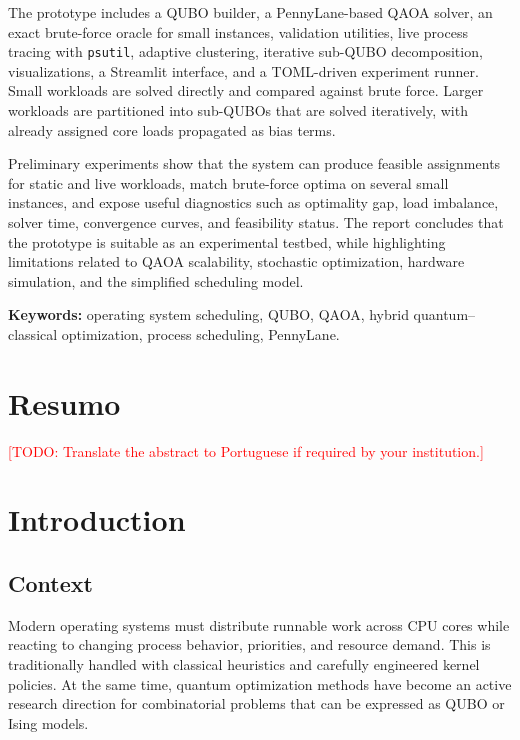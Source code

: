 \documentclass[12pt,a4paper,oneside]{report}
\newcommand{\todo}[1]{\textcolor{red}{[TODO: #1]}}
\begin{document}
The prototype includes a QUBO builder, a PennyLane-based QAOA solver, an exact
brute-force oracle for small instances, validation utilities, live process
tracing with \texttt{psutil}, adaptive clustering, iterative sub-QUBO
decomposition, visualizations, a Streamlit interface, and a TOML-driven
experiment runner. Small workloads are solved directly and compared against
brute force. Larger workloads are partitioned into sub-QUBOs that are solved
iteratively, with already assigned core loads propagated as bias terms.

Preliminary experiments show that the system can produce feasible assignments
for static and live workloads, match brute-force optima on several small
instances, and expose useful diagnostics such as optimality gap, load imbalance,
solver time, convergence curves, and feasibility status. The report concludes
that the prototype is suitable as an experimental testbed, while highlighting
limitations related to QAOA scalability, stochastic optimization, hardware
simulation, and the simplified scheduling model.

\textbf{Keywords:} operating system scheduling, QUBO, QAOA, hybrid
quantum--classical optimization, process scheduling, PennyLane.

\chapter*{Resumo}
\todo{Translate the abstract to Portuguese if required by your institution.}

\tableofcontents
\listoffigures
\listoftables

\clearpage
{}

\chapter{Introduction}

\section{Context}

Modern operating systems must distribute runnable work across CPU cores while
reacting to changing process behavior, priorities, and resource demand. This is
traditionally handled with classical heuristics and carefully engineered kernel
policies. At the same time, quantum optimization methods have become an active
research direction for combinatorial problems that can be expressed as QUBO or
Ising models.
\end{document}
